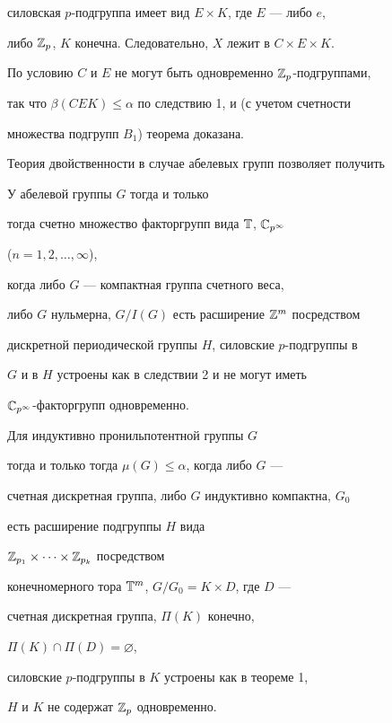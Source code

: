 силовская $p$-подгруппа имеет вид $E\times K$, где $E$ --- либо $e$,  


либо $\Bbb Z_p$, $K$ конечна. Следовательно, $X$ лежит в $C\times 


E\times K$. 


По условию $C$ и $E$ не могут быть одновременно $\Bbb 


Z_p$-подгруппами, 


так что $\beta(CEK)\le\alpha$ по следствию 1, и (с учетом счетности 


множества подгрупп $B_1$) теорема доказана. 


\medskip 


 


Теория двойственности в случае абелевых групп позволяет получить 


 


\begin{cor} 


У абелевой группы $G$ тогда и только  


тогда счетно множество факторгрупп вида $\Bbb T$, $\Bbb C_{p^\infty}$ 


($n=1,2,\dotsc,\infty$), 


когда либо $G$ --- компактная группа счетного веса,  


либо $G$ нульмерна, $G/I(G)$ есть расширение $\Bbb Z^m$ посредством  


дискретной периодической группы $H$, силовские $p$-подгруппы в  


$G$ и в $H$ устроены как в следствии 2 и не могут иметь  


$\Bbb C_{p^\infty}$-факторгрупп одновременно. 


\end{cor} 


 


\begin{cor} 


Для индуктивно пронильпотентной группы $G$ 


тогда и только тогда $\mu(G)\le\alpha$, когда либо $G$ --- 


счетная дискретная группа, либо $G$ индуктивно компактна, $G_0$ 


есть расширение подгруппы $H$ вида 


$\Bbb Z_{p_1}\times\dotsb\times\Bbb Z_{p_k}$ посредством 


конечномерного тора $\Bbb T^m$, $G/G_0=K\times D$, где $D$ --- 


счетная дискретная группа, $\Pi(K)$ конечно, 


$\Pi(K)\cap\Pi(D)=\varnothing$, 


силовские $p$-подгруппы в $K$ устроены как в теореме 1, 


$H$ и $K$ не содержат $\Bbb Z_p$ одновременно. 


\end{cor} 



